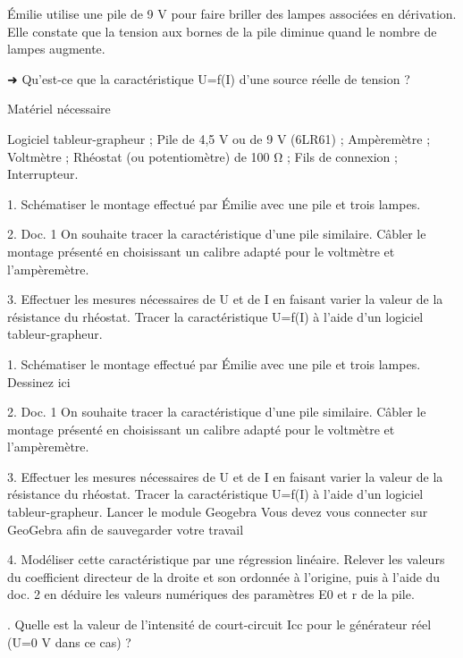 \documentclass[10pt]{article}
\begin{document}
\begin{center}

	Émilie utilise une pile de 9 V pour faire briller des lampes associées en dérivation.
	Elle constate que la tension aux bornes de la pile diminue quand le nombre de lampes augmente.

	➜ Qu’est-ce que la caractéristique U=f(I) d’une source réelle de tension ?

	Matériel nécessaire

	Logiciel tableur-grapheur ;
	Pile de 4,5 V ou de 9 V (6LR61) ;
	Ampèremètre ;
	Voltmètre ;
	Rhéostat (ou potentiomètre) de 100 Ω ;
	Fils de connexion ;
	Interrupteur.


	1. Schématiser le montage effectué par Émilie avec une pile et trois lampes.

	2. Doc. 1 On souhaite tracer la caractéristique d’une pile similaire. Câbler le montage présenté en choisissant un calibre adapté pour le voltmètre et l’ampèremètre.

	3. Effectuer les mesures nécessaires de U et de I en faisant varier la valeur de la résistance du rhéostat. Tracer la caractéristique U=f(I) à l’aide d’un logiciel tableur-grapheur.

	1. Schématiser le montage effectué par Émilie avec une pile et trois lampes.
	Dessinez ici


	2. Doc. 1 On souhaite tracer la caractéristique d’une pile similaire. Câbler le montage présenté en choisissant un calibre adapté pour le voltmètre et l’ampèremètre.

	3. Effectuer les mesures nécessaires de U et de I en faisant varier la valeur de la résistance du rhéostat. Tracer la caractéristique U=f(I) à l’aide d’un logiciel tableur-grapheur.
	Lancer le module Geogebra
	Vous devez vous connecter sur GeoGebra afin de sauvegarder votre travail

	4. Modéliser cette caractéristique par une régression linéaire. Relever les valeurs du coefficient directeur de la droite et son ordonnée à l’origine, puis à l’aide du doc. 2 en déduire les valeurs numériques des paramètres E0​ et r de la pile.

	. Quelle est la valeur de l’intensité de court-circuit Icc​ pour le générateur réel (U=0 V dans ce cas) ?




\end{center}
\end{document}
